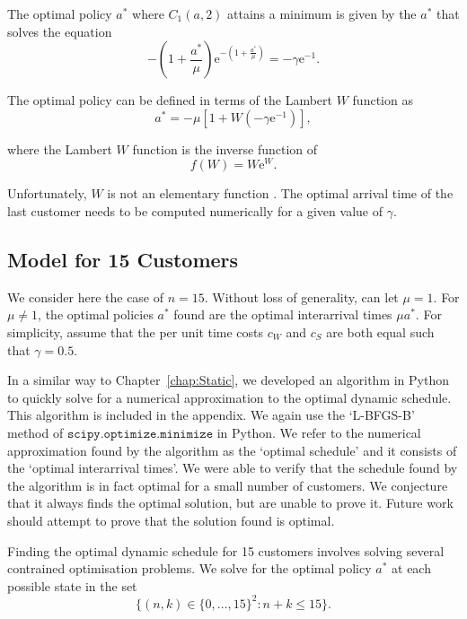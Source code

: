The optimal policy $a^{*}$ where $C_{1} (a, 2)$ attains a minimum is given by the $a^{*}$ that solves the equation
\begin{equation}
	- \left( 1 + \frac{a^{*}}{\mu} \right) \mathrm{e}^{- \left( 1 + \frac{a^{*}}{\mu} \right)} = - \gamma \mathrm{e}^{-1}.
\end{equation}

The optimal policy can be defined in terms of the Lambert $W$ function as
\begin{equation}
	a^{*} = - \mu \left[ 1 + W \left( - \gamma \mathrm{e}^{-1} \right) \right],
\end{equation}

where the Lambert $W$ function is the inverse function of
\begin{equation}
	f (W) = W \mathrm{e}^{W}.
\end{equation}

Unfortunately, $W$ is not an elementary function \citep{Chow}. The optimal arrival time of the last customer needs to be computed numerically for a given value of $\gamma$.

\subsection{Model for 15 Customers}
We consider here the case of $n = 15$. Without loss of generality, can let $\mu = 1$. For $\mu \neq 1$, the optimal policies $a^{*}$ found are the optimal interarrival times $\mu a^{*}$. For simplicity, assume that the per unit time costs $c_{W}$ and $c_{S}$ are both equal such that $\gamma = 0.5$.

In a similar way to Chapter~\ref{chap:Static}, we developed an algorithm in Python to quickly solve for a numerical approximation to the optimal dynamic schedule. This algorithm is included in the appendix. We again use the `L-BFGS-B' method of $\texttt{scipy.optimize.minimize}$ in Python. We refer to the numerical approximation found by the algorithm as the `optimal schedule' and it consists of the `optimal interarrival times'. We were able to verify that the schedule found by the algorithm is in fact optimal for a small number of customers. We conjecture that it always finds the optimal solution, but are unable to prove it. Future work should attempt to prove that the solution found is optimal.

Finding the optimal dynamic schedule for 15 customers involves solving several contrained optimisation problems. We solve for the optimal policy $a^{*}$ at each possible state in the set
\begin{equation}
	\Big\{ (n, k) \in \{ 0, \ldots, 15 \}^{2} : n + k \leq 15 \Big\}.
\end{equation}


